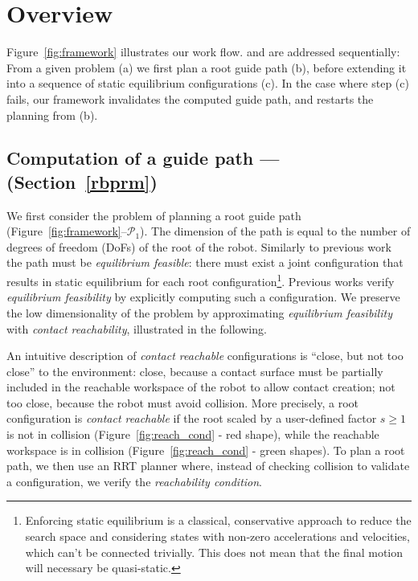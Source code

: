\documentclass[journal]{IEEEtran}
\newcommand{\deladp}[1]{\deleted[id=adp]{#1}}
\newcommand{\gls}[1]{\textit{#1}}
\begin{document}
\section{Overview}
\label{overview}


Figure~\ref{fig:framework} illustrates our work flow.
\Pa and \Pb are addressed sequentially: From a given problem (a) we first plan a root guide path (b), before
extending it into a sequence of static equilibrium configurations (c). In the case where step (c) fails,
our framework invalidates the computed guide path, and restarts the planning from (b).

%

\subsection{Computation of a guide path --- \Pa (Section~\ref{rbprm})}
We first consider the problem of planning a root guide path (Figure~\ref{fig:framework}--$\mathcal{P}_1$).  The dimension of the path is equal to the number of degrees of freedom (DoFs) of the root of the robot.
Similarly to previous work~\citep{Bouyarmane2009} the path must be \textit{equilibrium feasible}: there must exist a joint configuration that results in static equilibrium for each root configuration\footnote{Enforcing static equilibrium is a classical, conservative approach to reduce the search space and considering states  with non-zero accelerations and velocities, which can't be connected trivially. This does not mean that the final motion will necessary be quasi-static.}. Previous works verify \textit{equilibrium feasibility} by explicitly computing such a configuration. We preserve the low dimensionality of the problem by approximating \textit{equilibrium feasibility} with \textit{contact reachability}, illustrated in the following.

An intuitive description of \gls{contact reachable} configurations is ``close, but not too close'' to the environment: close, because a contact surface must be partially included in the reachable workspace of the robot to allow contact creation; not too close, because the robot must avoid collision.
More precisely, a root configuration is \textit{contact reachable} if the root scaled by a user-defined factor $s \geq 1$ is not in collision (Figure~\ref{fig:reach_cond} - red shape), while the reachable workspace is in collision (Figure~\ref{fig:reach_cond} - green shapes).
To plan a root path, we then use an RRT planner where, instead of checking collision to validate a configuration, we verify the \textit{reachability condition}.
\end{document}
